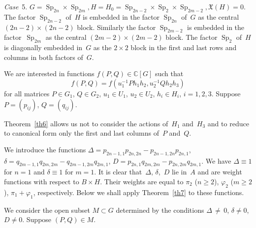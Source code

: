 \documentclass[12pt]{amsart}
\theoremstyle{definition}
\theoremstyle{remark}
\begin{document}
\textsl{Case}~5. $G={\operatorname{Sp}}_{2n}\times {\operatorname{Sp}}_{2m},
H=H_0={\operatorname{Sp}}_{2n-2}\times {\operatorname{Sp}}_2\times {\operatorname{Sp}}_{2m-2},
\mathfrak{X}(H)=0.$ The factor ${\operatorname{Sp}}_{2n-2}$ of~$H$ is embedded in
the factor ${\operatorname{Sp}}_{2n}$ of~$G$ as the central $(2n-2)\times(2n-2)$
block. Similarly the factor ${\operatorname{Sp}}_{2m-2}$ is embedded in the
factor~${\operatorname{Sp}}_{2m}$ as the central $(2m-2)\times(2m-2)$ block. The
factor ${\operatorname{Sp}}_2$ of~$H$ is diagonally embedded in~$G$ as the
$2\times2$ block in the first and last rows and columns in both
factors of~$G$.

We are interested in functions $f(P,Q)\in \mathbb{C}[G]$ such that
$$
f(P,Q)=f(u_1^{-1}Ph_1h_2,u_2^{-1}Qh_2h_3)
$$
for all matrices $P\in G_1$, $Q\in G_2$, $u_1\in U_1$, $u_2\in U_2$,
$h_i\in H_i$, $i=1,2,3$. Suppose $P=(p_{ij})$, $Q=(q_{ij})$.

Theorem~\ref{th6} allows us not to consider the actions of~$H_1$
and~$H_3$ and to reduce to canonical form only the first and last
columns of~$P$ and~$Q$.

We introduce the functions
$\Delta=p_{2n-1,1}p_{2n,2n}-p_{2n-1,2n}p_{2n,1}$,
$\delta=q_{2m-1,1}q_{2m,2m}-q_{2m-1,2m}q_{2m,1}$,
$D=p_{2n,1}q_{2m,2m}-p_{2n,2m}q_{2m,1}$. We have $\Delta\equiv 1$
for $n=1$ and $\delta\equiv1$ for $m=1$. It is clear that~$\Delta$,
$\delta$,~$D$ lie in~$A$ and are weight functions with respect to
$B\times H$. Their weights are equal to $\pi_2$ ($n{\geqslant}2$),
$\varphi_2$ ($m{\geqslant}2$), $\pi_1+\varphi_1$, respectively. Below we
shall apply Theorem~\ref{th7} to these functions.

We consider the open subset $M\subset G$ determined by the
conditions $\Delta\,{\ne}\,0$, $\delta \ne 0$,  $D\ne0$. Suppose
$(P,Q)\in M$.
\end{document}

